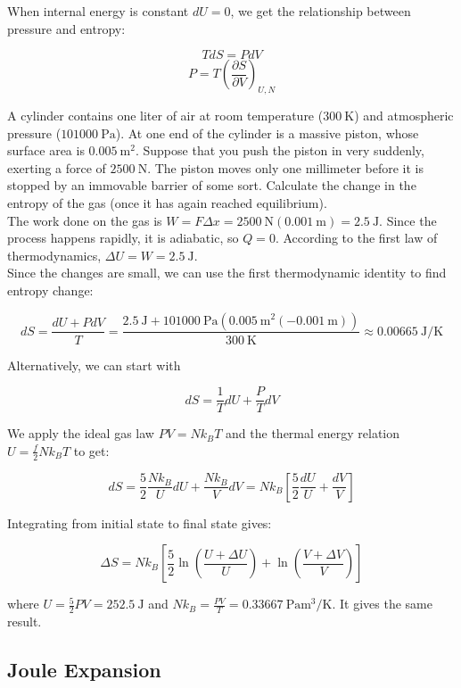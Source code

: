 When internal energy is constant $dU=0$, we get the relationship between pressure and entropy:

\[TdS=PdV\]
\[P=T\left(\frac{\partial S}{\partial V}\right)_{U,N}\]

\begin{texample}
	A cylinder contains one liter of air at room temperature ($\SI{300}{\kelvin}$) and atmospheric pressure ($\SI{101000}{\pascal}$). At one end of the cylinder is a massive piston, whose surface area is $\SI{0.005}{\meter\squared}$. Suppose that you push the piston in very suddenly, exerting a force of $\SI{2500}{\newton}$. The piston moves only one millimeter before it is stopped by an immovable barrier of some sort. Calculate the change in the entropy of the gas (once it has again reached equilibrium). \\
	
	The work done on the gas is $W=F\Delta x=\SI{2500}{\newton} (\SI{0.001}{\meter})=\SI{2.5}{\joule}$. Since the process happens rapidly, it is adiabatic, so $Q=0$. According to the first law of thermodynamics, $\Delta U=W=\SI{2.5}{\joule}$. \\
	
	Since the changes are small, we can use the first thermodynamic identity to find entropy change:
	
	\[dS=\frac{dU+PdV}{T}=\frac{\SI{2.5}{\joule}+\SI{101000}{\pascal} (\SI{0.005}{\meter\squared} (-\SI{0.001}{\meter}))}{\SI{300}{\kelvin}}\approx\SI{0.00665}{\joule\per\kelvin}\]
	
	Alternatively, we can start with
	
	\[dS=\frac{1}{T}dU+\frac{P}{T}dV\]
	
	We apply the ideal gas law $PV=Nk_BT$ and the thermal energy relation $U=\frac{f}{2} Nk_BT$ to get:
	
	\[dS=\frac{5}{2}\frac{Nk_B}{U}dU+\frac{Nk_B}{V}dV=Nk_B\left[ \frac{5}{2}\frac{dU}{U}+\frac{dV}{V} \right]\]
	
	Integrating from initial state to final state gives:
	
	\[\Delta S=Nk_B\left[ \frac{5}{2}\ln\left(\frac{U+\Delta U}{U}\right)+\ln\left(\frac{V+\Delta V}{V}\right) \right]\]
	
	where $U=\frac52 PV=\SI{252.5}{\joule}$ and $Nk_B=\frac{PV}{T}=\SI{0.33667}{\pascal\meter\cubed\per\kelvin}$. It gives the same result.
\end{texample}

\subsection{Joule Expansion}

